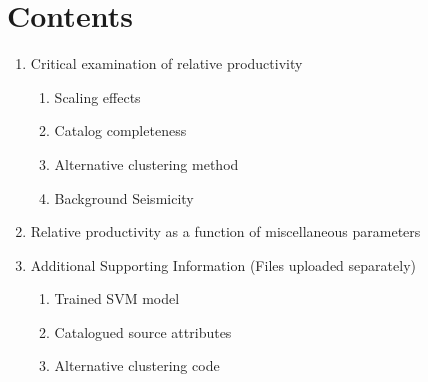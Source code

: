 \documentclass[draft]{agujournal}
\begin{document}

 

\large
\section*{Contents}
\begin{minipage}{.8\textwidth}

    \begin{enumerate}[label=\textbf{S\arabic*}]
    \item Critical examination of relative productivity\dotfill \pageref{sec:Critical}
    \begin{enumerate}[label*=\textbf{.\arabic*}]
    \setlength{\itemindent}{1.5em}
        \item Scaling effects\dotfill \pageref{sec:Critical}
        \item Catalog completeness\dotfill \pageref{sec:catalog}
        \item Alternative clustering method\dotfill \pageref{sec:alt}
        \item Background Seismicity\dotfill \pageref{sec:background}
    \end{enumerate}
    
    \item Relative productivity as a function of miscellaneous parameters \dotfill \pageref{sec:relative}
    \item{Additional Supporting Information (Files uploaded separately)}\dotfill \pageref{sec:additional}
    \begin{enumerate}[label*=\textbf{.\arabic*}]
    \setlength{\itemindent}{1.5em}
        \item Trained SVM  model\dotfill \pageref{sec:trained}
        \item Catalogued source attributes\dotfill \pageref{sec:source}
        \item Alternative clustering code\dotfill \pageref{sec:aftershock}
    \end{enumerate}
    \end{enumerate}
    
\end{minipage}
\end{document}
